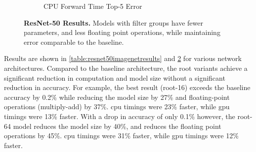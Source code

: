 \documentclass[thesis]{subfiles}
\begin{document}
\begin{figure}[p]
\begin{subfigure}[b]{\textwidth}
			\centering
			\caption{CPU Forward Time \vs Top-5 Error}
			\label{fig:resnet50cpuforward}
		\end{subfigure}
		\caption[ResNet-50  results]{\textbf{ResNet-50  Results.} Models with filter groups have fewer parameters, and less floating point operations, while maintaining error comparable to the baseline.}
		\label{fig:resnet50plots}
	\end{figure}
	Results are shown in \cref{table:resnet50imagenetresults} and \cref{fig:resnet50plots} for various network architectures. Compared to the baseline architecture, the root variants achieve a significant reduction in computation and model size without a significant reduction in accuracy. For example, the best result (root-16) exceeds the baseline accuracy by 0.2\% while reducing the model size by 27\% and floating-point operations (multiply-add) by 37\%. \gls{cpu} timings were 23\% faster, while \gls{gpu} timings were 13\% faster. With a drop in accuracy of only 0.1\% however, the root-64 model reduces the model size by 40\%, and reduces the floating point operations by 45\%. \gls{cpu} timings were 31\% faster, while \gls{gpu} timings were 12\% faster. 
	
\end{document}
